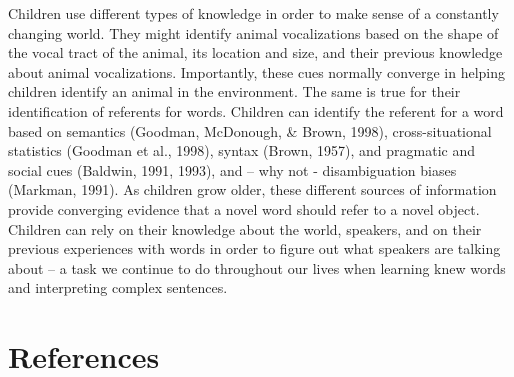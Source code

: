 \documentclass[english,floatsintext,man]{apa6}
\theoremstyle{definition}
\theoremstyle{definition}
\theoremstyle{definition}
\theoremstyle{remark}
\begin{document}
Children use different types of knowledge in order to make sense of a
constantly changing world. They might identify animal vocalizations
based on the shape of the vocal tract of the animal, its location and
size, and their previous knowledge about animal vocalizations.
Importantly, these cues normally converge in helping children identify
an animal in the environment. The same is true for their identification
of referents for words. Children can identify the referent for a word
based on semantics (Goodman, McDonough, \& Brown, 1998),
cross-situational statistics (Goodman et al., 1998), syntax (Brown,
1957), and pragmatic and social cues (Baldwin, 1991, 1993), and -- why
not - disambiguation biases (Markman, 1991). As children grow older,
these different sources of information provide converging evidence that
a novel word should refer to a novel object. Children can rely on their
knowledge about the world, speakers, and on their previous experiences
with words in order to figure out what speakers are talking about -- a
task we continue to do throughout our lives when learning knew words and
interpreting complex sentences.

\newpage

\section{References}\label{references}

\setlength{\parindent}{-0.5in} \setlength{\leftskip}{0.5in}
\end{document}
